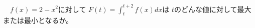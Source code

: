 \begin{problem}
　$f(x)=2-x^2$に対して
$\displaystyle F(t)=\int_t^{t+2}f(x)dx$は
$t$のどんな値に対して最大または最小となるか。
\end{problem}
